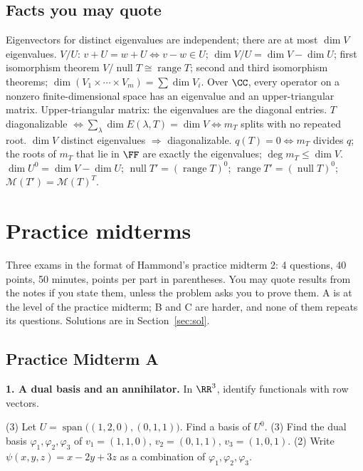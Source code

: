 \documentclass[10pt]{scrartcl}
\DeclareMathOperator{\nul}{null}
\DeclareMathOperator{\range}{range}
\DeclareMathOperator{\spn}{span}
\newcommand{\MM}{\mathcal M}
\begin{document}
\subsection{Facts you may quote}
\begin{itemize}
  \ii Eigenvectors for distinct eigenvalues are independent; there are at most $\dim V$ eigenvalues.
  \ii $V/U$: $v+U=w+U\iff v-w\in U$; $\dim V/U=\dim V-\dim U$; first isomorphism theorem $V/\nul T\cong\range T$; second and third isomorphism theorems; $\dim(V_1\times\cdots\times V_m)=\sum\dim V_i$.
  \ii Over $\CC$, every operator on a nonzero finite-dimensional space has an eigenvalue and an upper-triangular matrix.
  \ii Upper-triangular matrix: the eigenvalues are the diagonal entries.
  \ii $T$ diagonalizable $\iff\sum_\lambda\dim E(\lambda,T)=\dim V\iff m_T$ splits with no repeated root. $\dim V$ distinct eigenvalues $\Rightarrow$ diagonalizable.
  \ii $q(T)=0\iff m_T$ divides $q$; the roots of $m_T$ that lie in $\FF$ are exactly the eigenvalues; $\deg m_T\le\dim V$.
  \ii $\dim U^0=\dim V-\dim U$; $\nul T'=(\range T)^0$; $\range T'=(\nul T)^0$; $\MM(T')=\MM(T)^T$.
\end{itemize}
\section{Practice midterms}

Three exams in the format of Hammond's practice midterm 2: 4 questions, 40 points, 50 minutes, points per part in parentheses. You may quote results from the notes if you state them, unless the problem asks you to prove them. A is at the level of the practice midterm; B and C are harder, and none of them repeats its questions. Solutions are in Section~\ref{sec:sol}.

\clearpage\begingroup\subsection{Practice Midterm A}

\medskip\noindent\textbf{1. A dual basis and an annihilator.} In $\RR^3$, identify functionals with row vectors.
\begin{enumerate}[a)]
  \ii (3) Let $U=\spn\big((1,2,0),(0,1,1)\big)$. Find a basis of $U^0$.
  \ii (3) Find the dual basis $\varphi_1,\varphi_2,\varphi_3$ of $v_1=(1,1,0)$, $v_2=(0,1,1)$, $v_3=(1,0,1)$.
  \ii (2) Write $\psi(x,y,z)=x-2y+3z$ as a combination of $\varphi_1,\varphi_2,\varphi_3$.
\end{enumerate}
\end{document}
